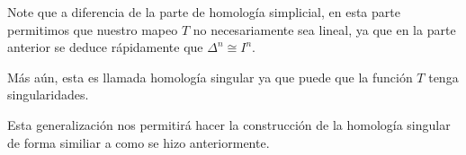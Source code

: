 \documentclass[12pt]{report}
\newcounter{it}
\theoremstyle{largebreak}
\begin{document}
    \begin{obs}
        Note que a diferencia de la parte de homología simplicial, en esta parte permitimos que nuestro mapeo $T$ no necesariamente sea lineal, ya que en la parte anterior se deduce rápidamente que $\Delta^n\cong I^n$.

        Más aún, esta es llamada homología singular ya que puede que la función $T$ tenga singularidades.
    \end{obs}

    Esta generalización nos permitirá hacer la construcción de la homología singular de forma similiar a como se hizo anteriormente.

    \begin{mydef}
        
    \end{mydef}
\end{document}
